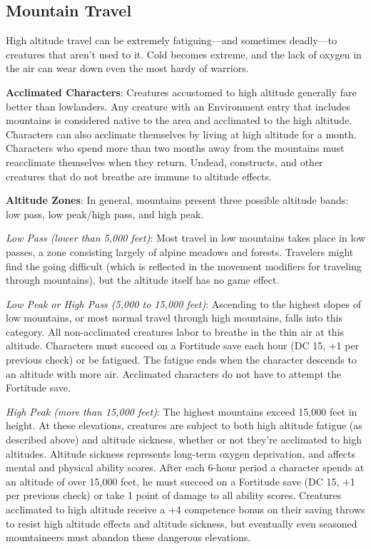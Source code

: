 \subsection{Mountain Travel}

				
High altitude travel can be extremely fatiguing---and sometimes deadly---to creatures that aren't used to it. Cold becomes extreme, and the lack of oxygen in the air can wear down even the most hardy of warriors.
				
\textbf{Acclimated Characters}: Creatures accustomed to high altitude generally fare better than lowlanders. Any creature with an Environment entry that includes mountains is considered native to the area and acclimated to the high altitude. Characters can also acclimate themselves by living at high altitude for a month. Characters who spend more than two months away from the mountains must reacclimate themselves when they return. Undead, constructs, and other creatures that do not breathe are immune to altitude effects.
				
\textbf{Altitude Zones}: In general, mountains present three possible altitude bands: low pass, low peak/high pass, and high peak. 
				
\textit{Low Pass (lower than 5,000 feet)}: Most travel in low mountains takes place in low passes, a zone consisting largely of alpine meadows and forests. Travelers might find the going difficult (which is reflected in the movement modifiers for traveling through mountains), but the altitude itself has no game effect.
				
\textit{Low Peak or High Pass (5,000 to 15,000 feet)}: Ascending to the highest slopes of low mountains, or most normal travel through high mountains, falls into this category. All non-acclimated creatures labor to breathe in the thin air at this altitude. Characters must succeed on a Fortitude save each hour (DC 15, +1 per previous check) or be fatigued. The fatigue ends when the character descends to an altitude with more air. Acclimated characters do not have to attempt the Fortitude save. 
				
\textit{High Peak (more than 15,000 feet)}: The highest mountains exceed 15,000 feet in height. At these elevations, creatures are subject to both high altitude fatigue (as described above) and altitude sickness, whether or not they're acclimated to high altitudes\textit{. }Altitude sickness represents long-term oxygen deprivation, and affects mental and physical ability scores. After each 6-hour period a character spends at an altitude of over 15,000 feet, he must succeed on a Fortitude save (DC 15, +1 per previous check) or take 1 point of damage to all ability scores. Creatures acclimated to high altitude receive a +4 competence bonus on their saving throws to resist high altitude effects and altitude sickness, but eventually even seasoned mountaineers must abandon these dangerous elevations. 
				
